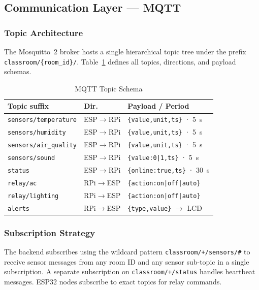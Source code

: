 \subsection{Communication Layer — MQTT}
\label{subsec:mqtt_layer}

\subsubsection{Topic Architecture}
The Mosquitto~2 broker hosts a single hierarchical topic tree under the
prefix \texttt{classroom/\{room\_id\}/}.  Table~\ref{tab:mqtt_schema}
defines all topics, directions, and payload schemas.

\begin{table}[H]
\centering
\caption{MQTT Topic Schema}
\label{tab:mqtt_schema}
\begin{tabular}{@{}p{2.8cm}p{1.1cm}p{3.6cm}@{}}
\toprule
\textbf{Topic suffix} & \textbf{Dir.} & \textbf{Payload / Period} \\
\midrule
\texttt{sensors/temperature} & ESP$\rightarrow$RPi & \texttt{\{value,unit,ts\}} · 5~s \\
\texttt{sensors/humidity}    & ESP$\rightarrow$RPi & \texttt{\{value,unit,ts\}} · 5~s \\
\texttt{sensors/air\_quality}& ESP$\rightarrow$RPi & \texttt{\{value,unit,ts\}} · 5~s \\
\texttt{sensors/sound}       & ESP$\rightarrow$RPi & \texttt{\{value:0|1,ts\}} · 5~s \\
\texttt{status}              & ESP$\rightarrow$RPi & \texttt{\{online:true,ts\}} · 30~s \\
\texttt{relay/ac}            & RPi$\rightarrow$ESP & \texttt{\{action:on|off|auto\}} \\
\texttt{relay/lighting}      & RPi$\rightarrow$ESP & \texttt{\{action:on|off|auto\}} \\
\texttt{alerts}              & RPi$\rightarrow$ESP & \texttt{\{type,value\}} $\rightarrow$ LCD \\
\bottomrule
\end{tabular}
\end{table}

\subsubsection{Subscription Strategy}
The backend subscribes using the wildcard pattern
\texttt{classroom/+/sensors/\#} to receive sensor messages from any
room ID and any sensor sub-topic in a single subscription.  A separate
subscription on \texttt{classroom/+/status} handles heartbeat messages.
ESP32 nodes subscribe to exact topics for relay commands.

